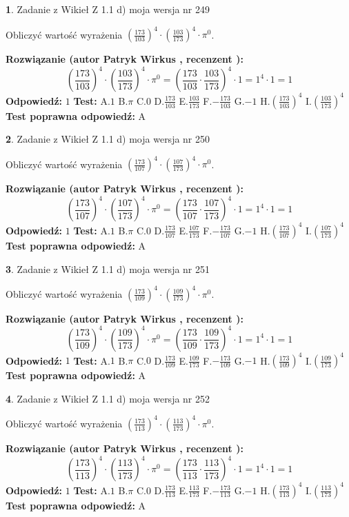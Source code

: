 \documentclass[12pt, a4paper]{article}
\theoremstyle{definition} %
\newtheorem{zad}{}
\newcommand{\zadStart}[1]{\begin{zad}#1\newline}
\newcommand{\zadStop}{\end{zad}}
\newcommand{\rozwStart}[2]{\noindent \textbf{Rozwiązanie (autor #1 , recenzent #2): }\newline}
\newcommand{\rozwStop}{\newline}
\newcommand{\odpStart}{\noindent \textbf{Odpowiedź:}\newline}
\newcommand{\odpStop}{\newline}
\newcommand{\testStart}{\noindent \textbf{Test:}\newline}
\newcommand{\testStop}{\newline}
\newcommand{\kluczStart}{\noindent \textbf{Test poprawna odpowiedź:}\newline}
\newcommand{\kluczStop}{\newline}
\begin{document}
\zadStart{Zadanie z Wikieł Z 1.1 d) moja wersja nr 249}

Obliczyć wartość wyrażenia $(\frac{173}{103})^{4} \cdot (\frac{103}{173})^{4} \cdot \pi^{0}$.
\zadStop
\rozwStart{Patryk Wirkus}{}
$$(\frac{173}{103})^{4} \cdot (\frac{103}{173})^{4} \cdot \pi^{0} = (\frac{173}{103} \cdot \frac{103}{173})^{4} \cdot 1 = 1^{4} \cdot 1 = 1$$
\rozwStop
\odpStart
$1$
\odpStop
\testStart
A.$1$ B.$\pi$ C.$0$ D.$\frac{173}{103}$ E.$\frac{103}{173}$
F.$-\frac{173}{103}$ G.$-1$
H.$(\frac{173}{103})^{4}$
I.$(\frac{103}{173})^{4}$
\testStop
\kluczStart
A
\kluczStop



\zadStart{Zadanie z Wikieł Z 1.1 d) moja wersja nr 250}

Obliczyć wartość wyrażenia $(\frac{173}{107})^{4} \cdot (\frac{107}{173})^{4} \cdot \pi^{0}$.
\zadStop
\rozwStart{Patryk Wirkus}{}
$$(\frac{173}{107})^{4} \cdot (\frac{107}{173})^{4} \cdot \pi^{0} = (\frac{173}{107} \cdot \frac{107}{173})^{4} \cdot 1 = 1^{4} \cdot 1 = 1$$
\rozwStop
\odpStart
$1$
\odpStop
\testStart
A.$1$ B.$\pi$ C.$0$ D.$\frac{173}{107}$ E.$\frac{107}{173}$
F.$-\frac{173}{107}$ G.$-1$
H.$(\frac{173}{107})^{4}$
I.$(\frac{107}{173})^{4}$
\testStop
\kluczStart
A
\kluczStop



\zadStart{Zadanie z Wikieł Z 1.1 d) moja wersja nr 251}

Obliczyć wartość wyrażenia $(\frac{173}{109})^{4} \cdot (\frac{109}{173})^{4} \cdot \pi^{0}$.
\zadStop
\rozwStart{Patryk Wirkus}{}
$$(\frac{173}{109})^{4} \cdot (\frac{109}{173})^{4} \cdot \pi^{0} = (\frac{173}{109} \cdot \frac{109}{173})^{4} \cdot 1 = 1^{4} \cdot 1 = 1$$
\rozwStop
\odpStart
$1$
\odpStop
\testStart
A.$1$ B.$\pi$ C.$0$ D.$\frac{173}{109}$ E.$\frac{109}{173}$
F.$-\frac{173}{109}$ G.$-1$
H.$(\frac{173}{109})^{4}$
I.$(\frac{109}{173})^{4}$
\testStop
\kluczStart
A
\kluczStop



\zadStart{Zadanie z Wikieł Z 1.1 d) moja wersja nr 252}

Obliczyć wartość wyrażenia $(\frac{173}{113})^{4} \cdot (\frac{113}{173})^{4} \cdot \pi^{0}$.
\zadStop
\rozwStart{Patryk Wirkus}{}
$$(\frac{173}{113})^{4} \cdot (\frac{113}{173})^{4} \cdot \pi^{0} = (\frac{173}{113} \cdot \frac{113}{173})^{4} \cdot 1 = 1^{4} \cdot 1 = 1$$
\rozwStop
\odpStart
$1$
\odpStop
\testStart
A.$1$ B.$\pi$ C.$0$ D.$\frac{173}{113}$ E.$\frac{113}{173}$
F.$-\frac{173}{113}$ G.$-1$
H.$(\frac{173}{113})^{4}$
I.$(\frac{113}{173})^{4}$
\testStop
\kluczStart
A
\kluczStop
\end{document}
